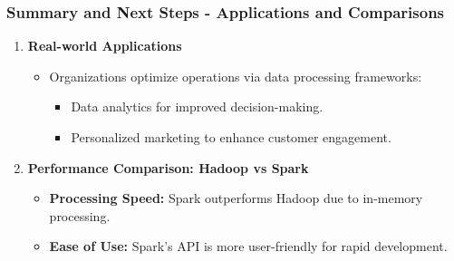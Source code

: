 \documentclass{beamer}
\begin{document}
\begin{frame}[fragile]
    \frametitle{Summary and Next Steps - Applications and Comparisons}
    \begin{enumerate}[resume]
        \item \textbf{Real-world Applications}
        \begin{itemize}
            \item Organizations optimize operations via data processing frameworks:
            \begin{itemize}
                \item Data analytics for improved decision-making.
                \item Personalized marketing to enhance customer engagement.
            \end{itemize}
        \end{itemize}

        \item \textbf{Performance Comparison: Hadoop vs Spark}
        \begin{itemize}
            \item \textbf{Processing Speed:} Spark outperforms Hadoop due to in-memory processing.
            \item \textbf{Ease of Use:} Spark's API is more user-friendly for rapid development.
        \end{itemize}
    \end{enumerate}
\end{frame}
\end{document}

